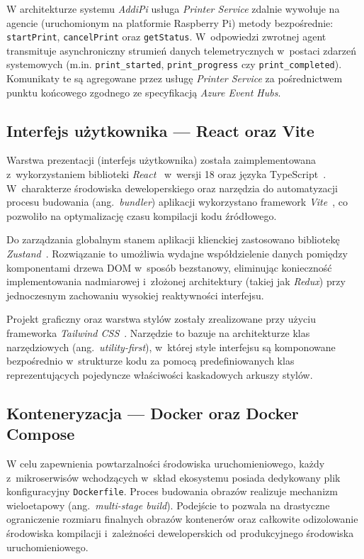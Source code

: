 \documentclass[a4paper,12pt,reqno]{article}
\begin{document}
W architekturze systemu \textit{AddiPi} usługa \textit{Printer Service} zdalnie wywołuje na agencie (uruchomionym na platformie Raspberry Pi) metody bezpośrednie: \texttt{startPrint}, \texttt{cancelPrint} oraz \texttt{getStatus}. W~odpowiedzi zwrotnej agent transmituje asynchroniczny strumień danych telemetrycznych w~postaci zdarzeń systemowych (m.in. \texttt{print\_started}, \texttt{print\_progress} czy \texttt{print\_completed}). Komunikaty te są agregowane przez usługę \textit{Printer Service} za pośrednictwem punktu końcowego zgodnego ze specyfikacją \textit{Azure Event Hubs}.

\subsection{Interfejs użytkownika --- React oraz Vite}

Warstwa prezentacji (interfejs użytkownika) została zaimplementowana z~wykorzystaniem biblioteki \textit{React}~\cite{react} w~wersji 18 oraz języka TypeScript~\cite{typescript}. W~charakterze środowiska deweloperskiego oraz narzędzia do automatyzacji procesu budowania (ang.~\textit{bundler}) aplikacji wykorzystano framework \textit{Vite}~\cite{vite}, co pozwoliło na optymalizację czasu kompilacji kodu źródłowego.

Do zarządzania globalnym stanem aplikacji klienckiej zastosowano bibliotekę \textit{Zustand}~\cite{zustand}. Rozwiązanie to umożliwia wydajne współdzielenie danych pomiędzy komponentami drzewa DOM w~sposób bezstanowy, eliminując konieczność implementowania nadmiarowej i~złożonej architektury (takiej jak \textit{Redux}) przy jednoczesnym zachowaniu wysokiej reaktywności interfejsu.

Projekt graficzny oraz warstwa stylów zostały zrealizowane przy użyciu frameworka \textit{Tailwind CSS}~\cite{tailwind}. Narzędzie to bazuje na architekturze klas narzędziowych (ang.~\textit{utility-first}), w~której style interfejsu są komponowane bezpośrednio w~strukturze kodu za pomocą predefiniowanych klas reprezentujących pojedyncze właściwości kaskadowych arkuszy stylów.

\subsection{Konteneryzacja --- Docker oraz Docker Compose}

W celu zapewnienia powtarzalności środowiska uruchomieniowego, każdy z~mikroserwisów wchodzących w~skład ekosystemu posiada dedykowany plik konfiguracyjny \texttt{Dockerfile}. Proces budowania obrazów realizuje mechanizm wieloetapowy (ang.~\textit{multi-stage build}). Podejście to pozwala na drastyczne ograniczenie rozmiaru finalnych obrazów kontenerów oraz całkowite odizolowanie środowiska kompilacji i~zależności deweloperskich od produkcyjnego środowiska uruchomieniowego.
\end{document}
